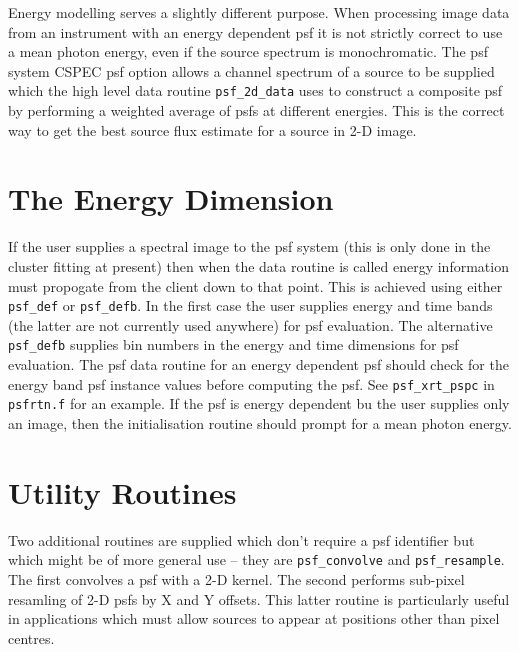 Energy modelling serves a slightly different purpose. When processing
image data from an instrument with an energy dependent psf it is not
strictly correct to use a mean photon energy, even if the source spectrum
is monochromatic. The psf system CSPEC psf option allows a channel spectrum
of a source to be supplied which the high level data routine
\verb+psf_2d_data+ uses to construct a composite psf by performing a
weighted average of psfs at different energies. This is the correct way
to get the best source flux estimate for a source in 2-D image.


\section{The Energy Dimension}

If the user supplies a spectral image to the psf system (this is only done
in the cluster fitting at present) then when the data routine is called 
energy information must propogate from the client down to that point. This
is achieved using either \verb+psf_def+ or \verb+psf_defb+. In the first
case the user supplies energy and time bands (the latter are not currently
used anywhere) for psf evaluation. The alternative \verb+psf_defb+ supplies
bin numbers in the energy and time dimensions for psf evaluation. The psf
data routine for an energy dependent psf should check for the energy band psf
instance values before computing the psf. See \verb+psf_xrt_pspc+ in
\verb+psfrtn.f+ for an example. If the psf is energy dependent bu the
user supplies only an image, then the initialisation routine should
prompt for a mean photon energy.

\section{Utility Routines}

Two additional routines are supplied which don't require a psf identifier
but which might be of more general use -- they are \verb+psf_convolve+ and
\verb+psf_resample+. The first convolves a psf with a 2-D kernel. The
second performs sub-pixel resamling of 2-D psfs by X and Y offsets. This
latter routine is particularly useful in applications which must allow
sources to appear at positions other than pixel centres.


